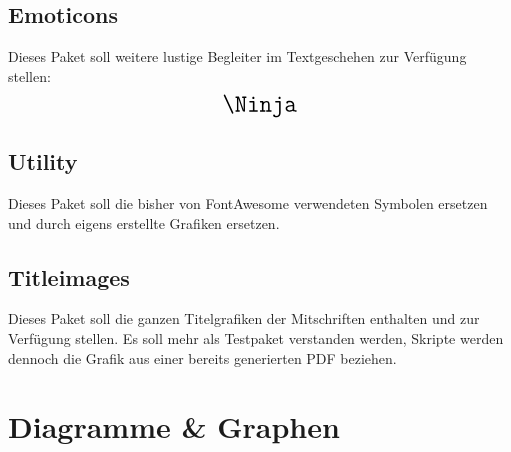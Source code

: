 \subsection{Emoticons  }
Dieses Paket soll weitere lustige Begleiter im Textgeschehen zur Verfügung stellen: \[\text{\LARGE\Ninja}\]

\subsection{Utility  }
Dieses Paket soll die bisher von FontAwesome verwendeten Symbolen ersetzen und durch eigens erstellte Grafiken ersetzen.

\subsection{Titleimages  }
Dieses Paket soll die ganzen Titelgrafiken der Mitschriften enthalten und zur Verfügung stellen. Es soll mehr als Testpaket verstanden werden, Skripte werden dennoch die Grafik aus einer bereits generierten PDF beziehen.
\normalmarginpar
\section{Diagramme \& Graphen}
